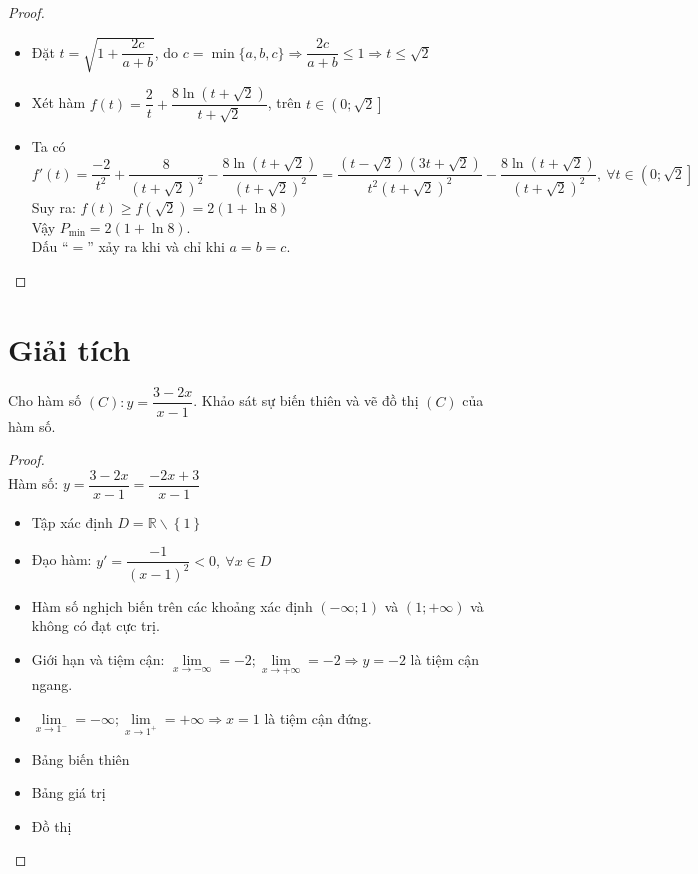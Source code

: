 \begin{proof}
\begin{itemize}
	\item Đặt $t=\sqrt{1+\dfrac{2c}{a+b}}$, do $c=\min\{a,b,c\}\Rightarrow \dfrac{2c}{a+b}\leq 1\Rightarrow t\leq \sqrt{2}$\\[10pt]
	\item Xét hàm $f(t)=\dfrac{2}{t}+\dfrac{8\ln\left(t+\sqrt{2}\right)}{t+\sqrt{2}}$, trên $t\in\left(0;\sqrt{2}\right]$\\[10pt]
	\item Ta có
	$$f'(t)=\frac{-2}{t^2}+\frac{8}{\left(t+\sqrt{2}\right)^2}-\frac{8\ln\left(t+ \sqrt{2}\right)}{\left(t+\sqrt{2}\right)^2}=
	\frac{\left(t-\sqrt{2}\right)\left(3t+\sqrt{2}\right)}{t^2\left(t+\sqrt{2}\right)^2}-\frac{8\ln\left(t+ \sqrt{2}\right)}{\left(t+\sqrt{2}\right)^2},~\forall t\in\left(0;\sqrt{2}\right] 
	$$
	Suy ra: $f(t)\geq f(\sqrt{2})=2\left(1+\ln 8\right)$\\[-5pt]


	Vậy $P_{\min} =2\left(1+\ln 8\right)$.\\[8pt]
	Dấu ``$=$'' xảy ra khi và chỉ khi $a=b=c$.
	\end{itemize}
\end{proof}

\section{Giải tích}
\begin{dl}
	Cho hàm số $(C): y=\dfrac{3-2x}{x-1}$. Khảo sát sự biến thiên và vẽ đồ thị $(C)$ của hàm số.
\end{dl}
\begin{proof}~\\[8pt]
	Hàm số:
	$y=\dfrac{3-2x}{x-1}=\dfrac{-2x+3}{x-1}$
	\begin{itemize}
		\item Tập xác định $D=\mathbb{R} \backslash \left\{ 1 \right\}$
		\item Đạo hàm: $y'=\dfrac{-1}{(x-1)^2}<0,~\forall x\in D$
		\item Hàm số nghịch biến trên các khoảng xác định $(-\infty;1)$ và $(1;+\infty)$ và không có đạt cực trị.		
		\item Giới hạn và tiệm cận: 
		$\lim\limits_{x\rightarrow -\infty} =-2;  \lim\limits_{x\rightarrow +\infty} =-2\Rightarrow y=-2$ là tiệm cận ngang.
		\item $\lim\limits_{x\rightarrow 1^-} =-\infty; \lim\limits_{x\rightarrow 1^+} =+\infty\Rightarrow x=1$ là tiệm cận đứng.		
		\item Bảng biến thiên
		\begin{center}
			
		\end{center}
		\item Bảng giá trị
		\begin{center}
			
		\end{center}
		\item Đồ thị
		\begin{center}
			
		\end{center}
	\end{itemize}
\end{proof}

